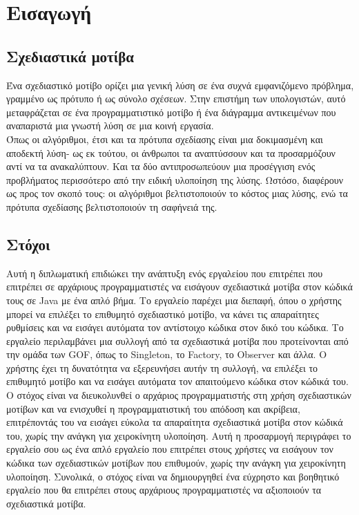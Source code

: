 \chapter{Εισαγωγή}
\label{ch:Introduction}
\section{Σχεδιαστικά μοτίβα}
\label{sec:patterns}
Ένα σχεδιαστικό μοτίβο ορίζει μια γενική λύση σε ένα συχνά εμφανιζόμενο πρόβλημα, γραμμένο
ως πρότυπο ή ως σύνολο σχέσεων. Στην επιστήμη των υπολογιστών, αυτό μεταφράζεται σε ένα
προγραμματιστικό μοτίβο ή ένα διάγραμμα αντικειμένων που αναπαριστά μια γνωστή λύση σε μια
κοινή εργασία. \\
Όπως οι αλγόριθμοι, έτσι και τα πρότυπα σχεδίασης είναι μια δοκιμασμένη και αποδεκτή λύση-
ως εκ τούτου, οι άνθρωποι τα αναπτύσσουν και τα προσαρμόζουν αντί να τα ανακαλύπτουν.
Και τα δύο αντιπροσωπεύουν μια προσέγγιση ενός προβλήματος περισσότερο από την ειδική
υλοποίηση της λύσης. Ωστόσο, διαφέρουν ως προς τον σκοπό τους: οι αλγόριθμοι βελτιστοποιούν
το κόστος μιας λύσης, ενώ τα πρότυπα σχεδίασης βελτιστοποιούν τη σαφήνειά της.
\section{Στόχοι}
\label{sec:Objectives}
Αυτή η διπλωματική επιδιώκει την ανάπτυξη ενός εργαλείου που επιτρέπει που επιτρέπει σε αρχάριους προγραμματιστές να εισάγουν 
σχεδιαστικά μοτίβα στον κώδικά τους σε Java με ένα απλό βήμα. Το εργαλείο παρέχει μια διεπαφή, όπου ο χρήστης μπορεί να 
επιλέξει το επιθυμητό σχεδιαστικό μοτίβο, να κάνει τις απαραίτητες ρυθμίσεις και να εισάγει αυτόματα τον αντίστοιχο 
κώδικα στον δικό του κώδικα. Το εργαλείο περιλαμβάνει μια συλλογή από τα σχεδιαστικά μοτίβα που προτείνονται από την ομάδα των GOF, 
όπως το Singleton, το Factory, το Observer και άλλα. Ο χρήστης έχει τη δυνατότητα να εξερευνήσει αυτήν τη συλλογή, 
να επιλέξει το επιθυμητό μοτίβο και να εισάγει αυτόματα τον απαιτούμενο κώδικα στον κώδικά του. Ο στόχος είναι να διευκολυνθεί 
ο αρχάριος προγραμματιστής στη χρήση σχεδιαστικών μοτίβων και να ενισχυθεί η προγραμματιστική του απόδοση και ακρίβεια, 
επιτρέποντάς του να εισάγει εύκολα τα απαραίτητα σχεδιαστικά μοτίβα στον κώδικά του, χωρίς την ανάγκη για χειροκίνητη υλοποίηση. 
Αυτή η προσαρμογή περιγράφει το εργαλείο σου ως ένα απλό εργαλείο που επιτρέπει στους χρήστες να εισάγουν τον κώδικα των 
σχεδιαστικών μοτίβων που επιθυμούν, χωρίς την ανάγκη για χειροκίνητη υλοποίηση. Συνολικά, ο στόχος είναι να δημιουργηθεί ένα 
εύχρηστο και βοηθητικό εργαλείο που θα επιτρέπει στους αρχάριους προγραμματιστές να αξιοποιούν τα σχεδιαστικά μοτίβα.
